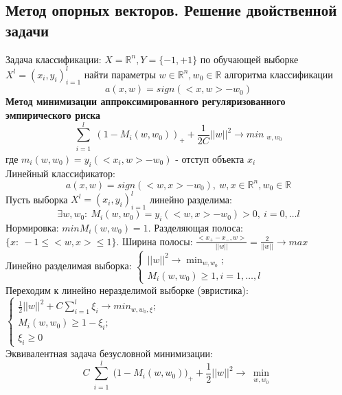 \documentclass[a4paper]{article}
\theoremstyle{plain}
\theoremstyle{remark}
\theoremstyle{definition}
\newcommand{\setR}{\mathbb{R}}
\newcommand{\setRn}{\mathbb{R}^n}
\renewcommand{\leq}{\leqslant}
\renewcommand{\geq}{\geqslant}
\begin{document}
\subsection{Метод опорных векторов. Решение двойственной задачи}
Задача классификации: $X = \setRn, Y = \{-1,+1\}$ по обучающей выборке $X^l=(x_i,y_i)_{i=1}^l$ найти параметры $w \in \setRn, w_0 \in \setR$ алгоритма классификации
$$ a(x,w) = sign(<x,w>-w_0) $$
\textbf{Метод минимизации аппроксимированного регуляризованного эмпирического риска} \\
$$ \sum_{\substack{i=1}}^l (1-M_i(w,w_0))_+ + \frac{1}{2C}||w||^2 \rightarrow min_{\substack{w,w_0}} $$
где $m_i(w,w_0)=y_i(<x_i,w>-w_0)$ - отступ объекта $x_i$ \\
Линейный классификатор: $$ a(x,w) = sign(<w,x>-w_0), \ w,x \in \setRn, w_0 \in \setR $$
Пусть выборка $X^l=(x_i,y_i)_{i=1}^l$ линейно разделима:
$$ \exists w,w_0: \ M_i(w,w_0)=y_i(<w,x>-w_0)>0, \ i = 0, \ldots l $$
Нормировка: $ min M_i(w,w_0)=1$. Разделяющая полоса: $\{x: \ -1 \leq <w,x> \leq 1\}$. Ширина полосы: $\frac{<x_+-x_-, w>}{||w||}=\frac{2}{||w||} \rightarrow max$ \\
Линейно разделимая выборка: $ 
\begin{cases}
	||w||^2 \rightarrow \min_{w,w_0};\\
	M_i(w,w_0) \geq 1, i = 1, \ldots, l
\end{cases}$ \\
Переходим к линейно неразделимой выборке (эвристика): $
\begin{cases}
	\frac{1}{2}||w||^2 + C \sum_{i=1}^l \xi_i \rightarrow min_{w,w_0,\xi};\\
	M_i(w,w_0) \geq 1-\xi_i; \\
	\xi_i \geq 0
\end{cases}$ \\
Эквивалентная задача безусловной минимизации: $$ C\sum_{\substack{i=1}}^l \big( 1-M_i(w,w_0)\big)_+ + \frac{1}{2}||w||^2 \rightarrow \min_{\substack{w,w_0}} $$
\end{document}
